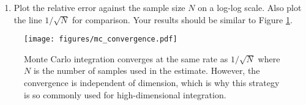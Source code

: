 \begin{problem}
\begin{enumerate}
\item Plot the relative error against the sample size $N$ on a log-log scale.
Also plot the line $1/\sqrt{N}$ for comparison.
Your results should be similar to Figure \ref{fig:monte-carlo-convergence}.
\end{enumerate}
\end{problem}

\begin{figure}[H] %
\texttt{[image: figures/mc\_convergence.pdf]}
\caption{Monte Carlo integration converges at the same rate as $1/\sqrt{N}$ where $N$ is the number of samples used in the estimate.
However, the convergence is independent of dimension, which is why this strategy is so commonly used for high-dimensional integration.
}
\label{fig:monte-carlo-convergence}
\end{figure}
